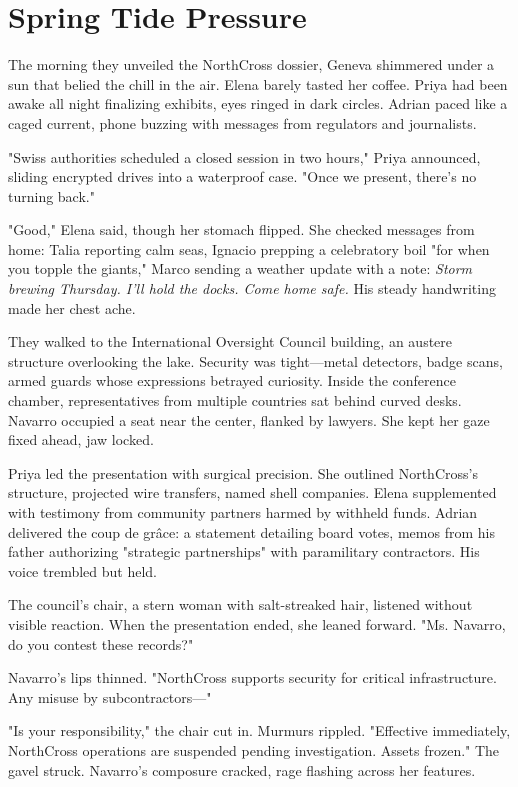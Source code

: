 \chapter{Spring Tide Pressure}

The morning they unveiled the NorthCross dossier, Geneva shimmered under a sun that belied the chill in the air. Elena barely tasted her coffee. Priya had been awake all night finalizing exhibits, eyes ringed in dark circles. Adrian paced like a caged current, phone buzzing with messages from regulators and journalists.

"Swiss authorities scheduled a closed session in two hours," Priya announced, sliding encrypted drives into a waterproof case. "Once we present, there's no turning back."

"Good," Elena said, though her stomach flipped. She checked messages from home: Talia reporting calm seas, Ignacio prepping a celebratory boil "for when you topple the giants," Marco sending a weather update with a note: \textit{Storm brewing Thursday. I'll hold the docks. Come home safe.} His steady handwriting made her chest ache.

They walked to the International Oversight Council building, an austere structure overlooking the lake. Security was tight—metal detectors, badge scans, armed guards whose expressions betrayed curiosity. Inside the conference chamber, representatives from multiple countries sat behind curved desks. Navarro occupied a seat near the center, flanked by lawyers. She kept her gaze fixed ahead, jaw locked.

Priya led the presentation with surgical precision. She outlined NorthCross's structure, projected wire transfers, named shell companies. Elena supplemented with testimony from community partners harmed by withheld funds. Adrian delivered the coup de grâce: a statement detailing board votes, memos from his father authorizing "strategic partnerships" with paramilitary contractors. His voice trembled but held.

The council's chair, a stern woman with salt-streaked hair, listened without visible reaction. When the presentation ended, she leaned forward. "Ms. Navarro, do you contest these records?"

Navarro's lips thinned. "NorthCross supports security for critical infrastructure. Any misuse by subcontractors—"

"Is your responsibility," the chair cut in. Murmurs rippled. "Effective immediately, NorthCross operations are suspended pending investigation. Assets frozen." The gavel struck. Navarro's composure cracked, rage flashing across her features.

